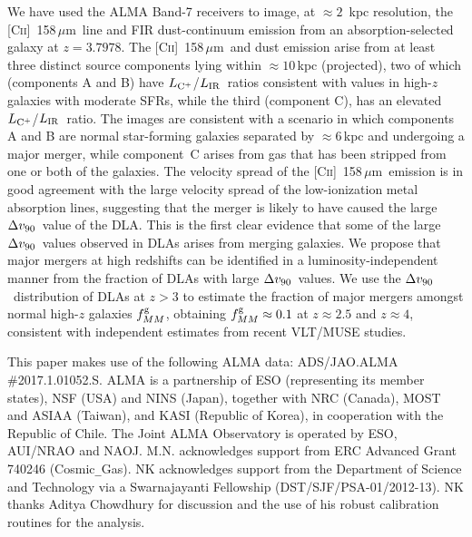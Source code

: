 \documentclass[twocolumn]{aastex62}
\newcommand{\cplus}{[\ctwo]~158\,$\mu$m}
\newcommand{\zcube}{3.7978}
\newcommand{\rsep}{6}  %
\newcommand{\mdvninety}{\Delta v_{\rm 90}}
\newcommand{\dvninety}{$\mdvninety$}
\newcommand{\mfmg}{f_{MM}^{\rm g}}    %
\newcommand{\mldust}{L_{\rm IR}}  %
\newcommand{\ldust}{$\mldust$}
\newcommand{\mlcplus}{L_{\rm C^+}}   %
\newcommand{\lcplus}{$\mlcplus$}
\newcommand{\ctwo}{C\textsc{ii}}
\begin{document}
We have used the ALMA Band-7 receivers to image, at $\approx 2$~kpc resolution, the \cplus\ line 
and FIR dust-continuum emission from an absorption-selected galaxy at $z = \zcube$. The \cplus\ 
and dust emission arise from at least three distinct source components lying within $\approx 10$\,kpc 
(projected), two of which (components A and B) have \lcplus/\ldust\ ratios consistent with values 
in high-$z$ galaxies with moderate SFRs, while the third (component C), has an elevated \lcplus/\ldust\ 
ratio. The images are consistent with a scenario in which components A and B are normal star-forming 
galaxies separated by $\approx \rsep$\,kpc and undergoing a major merger, while component~C arises from 
gas that has been stripped from one or both of the galaxies. The velocity spread of the \cplus\ emission 
is in good agreement with the large velocity spread of the low-ionization metal absorption 
lines, suggesting that the merger is likely to have caused the large \dvninety\ value of the DLA. This is 
the first clear evidence that some of the large \dvninety\ values observed in DLAs arises from merging 
galaxies. We propose that major mergers at high redshifts can be identified in a luminosity-independent
manner from the fraction of DLAs with large \dvninety\ values. We use the \dvninety\ distribution 
of DLAs at $z > 3$ to estimate the fraction of major mergers amongst normal high-$z$ galaxies $\mfmg$,
obtaining $\mfmg \approx 0.1$ at $z\approx 2.5$ and $z \approx 4$, consistent with independent estimates 
from recent VLT/MUSE studies.


\acknowledgments
This paper makes use of the following ALMA data: ADS/JAO.ALMA \#2017.1.01052.S. ALMA 
is a partnership of ESO (representing its member states), NSF (USA) and NINS (Japan), 
together with NRC (Canada), MOST and ASIAA (Taiwan), and KASI (Republic of Korea), in 
cooperation with the Republic of Chile. The Joint ALMA Observatory is operated by ESO, 
AUI/NRAO and NAOJ. M.N. acknowledges support from ERC Advanced Grant 740246 (Cosmic{\verb|_|}Gas). 
NK acknowledges support from the Department of Science and Technology via a Swarnajayanti 
Fellowship (DST/SJF/PSA-01/2012-13). NK thanks Aditya Chowdhury for discussion and the use of 
his robust calibration routines for the analysis.





\end{document}
